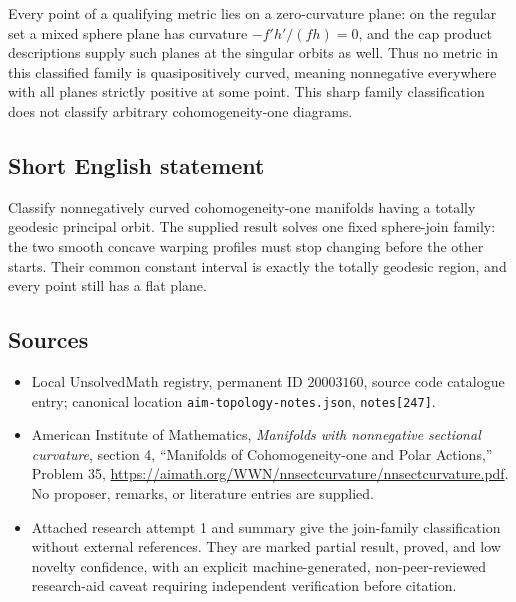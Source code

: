 \documentclass[11pt]{article}
\begin{document}
Every point of a qualifying metric lies on a zero-curvature plane: on the regular set a mixed sphere plane has curvature $-f'h'/(fh)=0$, and the cap product descriptions supply such planes at the singular orbits as well. Thus no metric in this classified family is quasipositively curved, meaning nonnegative everywhere with all planes strictly positive at some point. This sharp family classification does not classify arbitrary cohomogeneity-one diagrams.
\subsection{Short English statement}
Classify nonnegatively curved cohomogeneity-one manifolds having a totally geodesic principal orbit. The supplied result solves one fixed sphere-join family: the two smooth concave warping profiles must stop changing before the other starts. Their common constant interval is exactly the totally geodesic region, and every point still has a flat plane.
\subsection{Sources}
\begin{itemize}
\item Local UnsolvedMath registry, permanent ID $20003160$, source code catalogue entry; canonical location \texttt{aim-topology-notes.json}, \texttt{notes[247]}.
\item American Institute of Mathematics, \emph{Manifolds with nonnegative sectional curvature}, section 4, ``Manifolds of Cohomogeneity-one and Polar Actions,'' Problem 35, \url{https://aimath.org/WWN/nnsectcurvature/nnsectcurvature.pdf}. No proposer, remarks, or literature entries are supplied.
\item Attached research attempt 1 and summary give the join-family classification without external references. They are marked partial result, proved, and low novelty confidence, with an explicit machine-generated, non-peer-reviewed research-aid caveat requiring independent verification before citation.
\end{itemize}
\end{document}
